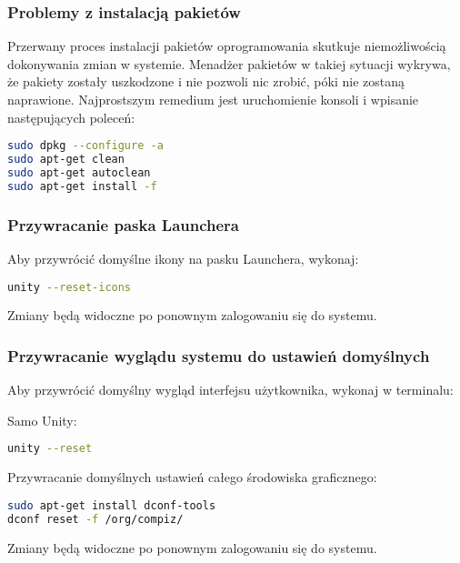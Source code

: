 \subsubsection{Problemy z instalacją pakietów}
Przerwany proces instalacji pakietów oprogramowania skutkuje niemożliwością dokonywania zmian w systemie. Menadżer pakietów w takiej sytuacji wykrywa, że pakiety zostały uszkodzone i nie pozwoli nic zrobić, póki nie zostaną naprawione. Najprostszym remedium jest uruchomienie konsoli  i wpisanie następujących poleceń:

\begin{lstlisting}[language=bash]
sudo dpkg --configure -a
sudo apt-get clean
sudo apt-get autoclean
sudo apt-get install -f
\end{lstlisting}
\clearpage
\subsubsection{Przywracanie paska Launchera}
Aby przywrócić domyślne ikony na pasku Launchera, wykonaj:

\begin{lstlisting}[language=bash]
unity --reset-icons
\end{lstlisting}

Zmiany będą widoczne po ponownym zalogowaniu się do systemu.

\subsubsection{Przywracanie wyglądu systemu do ustawień domyślnych}
\label{unity_reset} \noindent Aby przywrócić domyślny wygląd interfejsu użytkownika, wykonaj w terminalu:

\noindent Samo Unity:
\begin{lstlisting}[language=bash]
unity --reset
\end{lstlisting}

\noindent Przywracanie domyślnych ustawień całego środowiska graficznego:

\begin{lstlisting}[language=bash]
sudo apt-get install dconf-tools
dconf reset -f /org/compiz/
\end{lstlisting}

\noindent Zmiany będą widoczne po ponownym zalogowaniu się do systemu.
\clearpage
